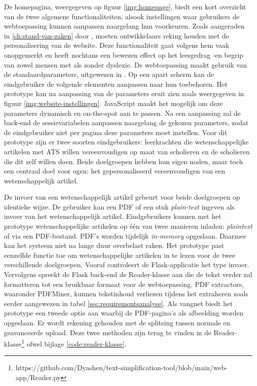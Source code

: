 De homepagina, weergegeven op figuur \ref{img:homepage}, biedt een kort overzicht van de twee algemene functionaliteiten, alsook instellingen waar gebruikers de webtoepassing kunnen aanpassen naargelang hun voorkeuren. Zoals aangeraden in \ref{ch:stand-van-zaken} door \textcite{Harvard2023}, moeten ontwikkelaars reking houden met de personalisering van de website. Deze functionaliteit gaat volgens hem vaak onopgemerkt en heeft nochtans een bewezen effect op het leesgedrag -en begrip van zowel mensen met als zonder dyslexie. De webtoepassing maakt gebruik van de standaardparameters, uitgewezen in \textcite{Rello2013a, Rello2013b}. Op een apart scherm kan de eindgebruiker de volgende elementen aanpassen naar hun toebehoren. Het prototype kan na aanpassing van de parameters eruit zien zoals weergegeven in figuur \ref{img:website-instellingen}. JavaScript maakt het mogelijk om deze parameters dynamisch en on-the-spot aan te passen. Na een aanpassing zal de back-end de sessievariabelen aanpassen naargelang de gekozen parameters, zodat de eindgebruiker niet per pagina deze parameters moet instellen. Voor dit prototype zijn er twee soorten eindgebruikers: leerkrachten die wetenschappelijke artikelen met ATS willen vereenvoudigen op maat van scholieren en de scholieren die dit zelf willen doen. Beide doelgroepen hebben hun eigen noden, maar toch een centraal doel voor ogen: het gepersonaliseerd vereenvoudigen van een wetenschappelijk artikel.

\medspace

De invoer van een wetenschappelijk artikel gebeurt voor beide doelgroepen op identieke wijze. De gebruiker kan een PDF of een stuk \textit{plain-text} ingeven als invoer van het wetenschappelijk artikel. Eindgebruikers kunnen met het prototype wetenschappelijke artikelen op één van twee manieren inladen: \textit{plaintext} of via een PDF-bestand. PDF's worden tijdelijk \textit{in-memory} opgeslaan. Daarmee kan het systeem niet na lange duur overbelast raken. Het prototype past eenzelfde functie toe om wetenschappelijke artikelen in te lezen voor de twee verschillende doelgroepen. Vooraf controleert de Flask-applicatie het type invoer. Vervolgens spreekt de Flask back-end de Reader-klasse aan die de tekst verder zal formatteren tot een bruikbaar formaat voor de webtoepassing. PDF extractors, waaronder PDFMiner, kunnen tekstinhoud verliezen tijdens het extraheren zoals eerder aangewezen in tabel \ref{sec:requirementsanalyse}. Als vangnet biedt het prototype een tweede optie aan waarbij de PDF-pagina's als afbeelding worden opgeslaan. Er wordt rekening gehouden met de splitsing tussen normale en geavanceerde upload. Deze twee methoden zijn terug te vinden in de Reader-klasse\footnote{https://github.com/Dyashen/text-simplification-tool/blob/main/web-app/Reader.py} ofwel bijlage \ref{code:reader-klasse}.

